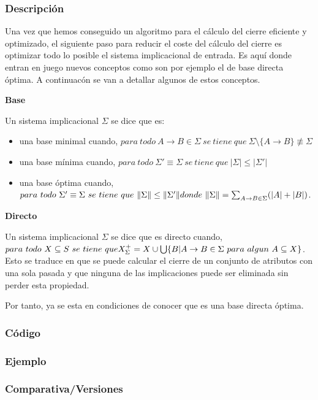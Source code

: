 \subsubsection{Descripci\'on} 
Una vez que hemos conseguido un algoritmo para el c\'alculo del cierre eficiente y optimizado, el siguiente paso para reducir el coste del c\'alculo del cierre es optimizar todo lo posible el sistema implicacional de entrada. Es aqu\'i donde entran en juego nuevos conceptos como son por ejemplo el de base directa \'optima. A continuac\'on se van a detallar algunos de estos conceptos.

\textbf{Base}

Un sistema implicacional \( \Sigma \) se dice que es:
\begin{itemize}
    \item una base minimal cuando,  \( para \ todo \ A \to B \in \Sigma \ se \ tiene \ que \ \Sigma \setminus \{A \to B\} \not\equiv \Sigma\)

    \item una base m\'inima cuando,  \( para \ todo \ \Sigma' \equiv \Sigma \ se \ tiene \ que \ |\Sigma| \leq |\Sigma'|\)

    \item una base \'optima cuando,  \( para \ todo \ \Sigma' \equiv \Sigma \ se \ tiene \ que \ \|\Sigma\| \leq \|\Sigma'\| \\ donde \ \|\Sigma\| = 
    \sum_{\substack{A \to B \in \Sigma}} (|A|+|B|) \).
\end{itemize}

\textbf{Directo}

Un sistema implicacional \( \Sigma \) se dice que es directo  cuando, \( para \ todo \ X \subseteq S \ se \ tiene \ que \\ X^+_{\Sigma} =  X \cup \bigcup\{ B | A \to B \in \Sigma \ para \ algun \ A \subseteq X \} \). Esto se traduce en que se puede calcular el cierre de un conjunto de atributos con una sola pasada y que ninguna de las implicaciones puede ser eliminada sin perder esta propiedad.

Por tanto, ya se esta en condiciones de conocer que es una base directa \'optima.
\newpage
\subsubsection{C\'odigo} 

\newpage
\subsubsection{Ejemplo} 
\subsubsection{Comparativa/Versiones} 
